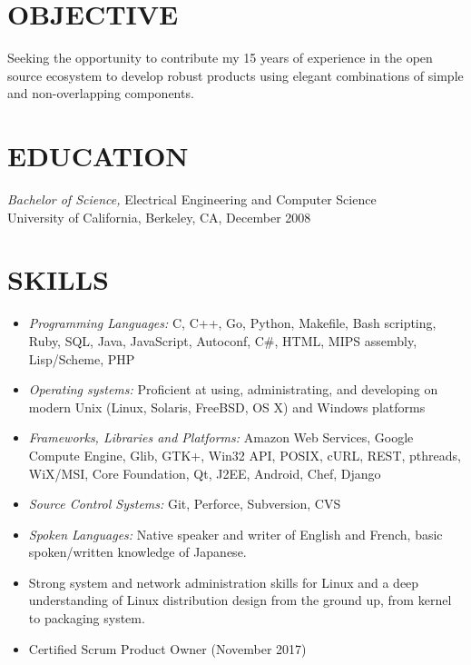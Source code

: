 \documentclass[overlapped,line,margin]{res}
\begin{document}
\address{(510) 646-0724}

\begin{resume}

\section{OBJECTIVE}
Seeking the opportunity to contribute my 15 years of experience in the open
source ecosystem to develop robust products using elegant combinations of
simple and non-overlapping components.

\section{EDUCATION} {\sl Bachelor of Science,} Electrical Engineering and Computer Science \\
  University of California, Berkeley, CA, December 2008

\section{SKILLS}
\begin{itemize}
\item {\sl Programming Languages:}
  C, C++, Go, Python, Makefile, Bash scripting, Ruby, SQL, Java, JavaScript,
  Autoconf, C\#, HTML, MIPS assembly, Lisp/Scheme, PHP
\item {\sl Operating systems:}
  Proficient at using, administrating, and developing on modern Unix (Linux,
  Solaris, FreeBSD, OS X) and Windows platforms
\item {\sl Frameworks, Libraries and Platforms:}
  Amazon Web Services, Google Compute Engine, Glib, GTK+, Win32 API, POSIX,
  cURL, REST, pthreads, WiX/MSI, Core Foundation, Qt, J2EE, Android, Chef,
  Django
\item {\sl Source Control Systems:}
  Git, Perforce, Subversion, CVS
\item {\sl Spoken Languages:}
  Native speaker and writer of English and French, basic spoken/written knowledge of
  Japanese.
\item Strong system and network administration skills for Linux and a
  deep understanding of Linux distribution design from the ground up, from
  kernel to packaging system.
\item Certified Scrum Product Owner (November 2017)
\end{itemize}


\end{resume}
\end{document}
